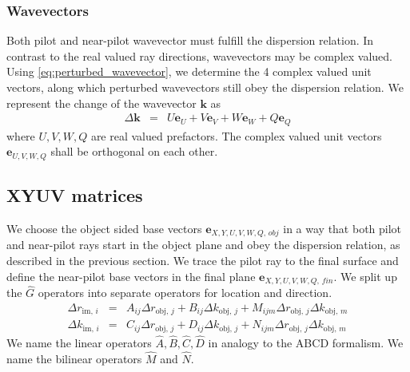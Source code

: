 \documentclass[12pt,a4paper,twoside,openright,BCOR10mm,headsepline,titlepage,abstracton,chapterprefix,final]{scrreprt}
\newcommand\Vector[1]{{\mathbf{#1}}}
\newcommand\wavenumber{k}
\newcommand\Wavevector{\Vector{\wavenumber}}
\newcommand\im{\textrm{im}}
\newcommand\obj{\textrm{obj}}
\begin{document}
\subsubsection{Wavevectors}
Both pilot and near-pilot wavevector must fulfill the dispersion relation. 
In contrast to the real valued ray directions, wavevectors may be complex valued.
Using \eqref{eq:perturbed_wavevector}, we determine the 4 complex valued unit vectors,
along which perturbed wavevectors still obey the dispersion relation.
We represent the change of the wavevector $\Wavevector$ as
\begin{eqnarray}
 \Delta \Wavevector &=& U \Vector{e}_U + V \Vector{e}_V + W \Vector{e}_W + Q \Vector{e}_Q
\end{eqnarray}
where $U,V,W,Q$ are real valued prefactors.
The complex valued unit vectors $\Vector{e}_{U,V,W,Q}$ shall be orthogonal on each other.

\subsection{XYUV matrices}
We choose the object sided base vectors 
$\Vector{e}_{X,Y,U,V,W,Q,\,obj}$ 
in a way that both pilot and near-pilot rays start in the object plane and obey the dispersion relation, 
as described in the previous section.
We trace the pilot ray to the final surface 
and define the near-pilot base vectors in the final plane
$\Vector{e}_{X,Y,U,V,W,Q,\,fin}$.
We split up the $\hat{G}$ operators into separate operators for location and direction.
\begin{eqnarray}
 \Delta r_{\im,\,i}  &=& A_{ij} \Delta r_{\obj,\,j} + B_{ij} \Delta k_{\obj,\,j} + M_{ijm} \Delta r_{\obj,\,j} \Delta k_{\obj,\,m} \\ 
 \Delta \wavenumber_{\im,\,i} &=& C_{ij} \Delta r_{\obj,\,j} + D_{ij} \Delta k_{\obj,\,j} + N_{ijm} \Delta r_{\obj,\,j} \Delta k_{\obj,\,m}
\end{eqnarray}
We name the linear operators $\hat{A}, \hat{B}, \hat{C}, \hat{D}$ in analogy to the ABCD formalism.
We name the bilinear operators $\hat{M}$ and $\hat{N}$.
\end{document}
